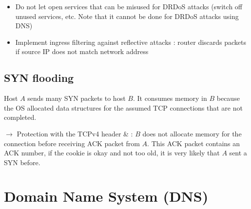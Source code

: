\begin{itemize}
    \item Do not let open services that can be misused for DRDoS attacks (switch off unused services, etc. Note that it cannot be done for DRDoS attacks using DNS)
    \item Implement ingress filtering against reflective attacks : router discards packets if source IP does not match network address
\end{itemize}

\section{SYN flooding}

Host $A$ sends many SYN packets to host $B$. It consumes memory in $B$ because the OS allocated data structures for the assumed TCP connections that are not completed. 

$\rightarrow$ Protection with the TCPv4 header \&  : $B$ does not allocate memory for the connection before receiving ACK packet from $A$. This ACK packet contains an ACK number, if the cookie is okay and not too old, it is very likely that $A$ sent a SYN before.

\chapter{Domain Name System (DNS)}

